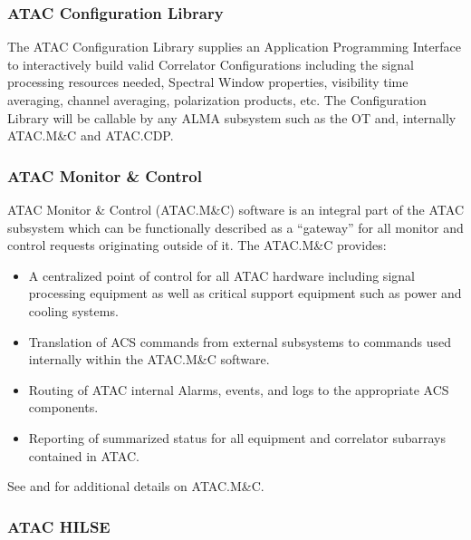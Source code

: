 \subsubsection{ATAC Configuration Library}

The \ac{ATAC} Configuration Library supplies an Application Programming Interface to interactively build valid Correlator Configurations including the signal processing resources needed, Spectral Window properties, visibility time averaging, channel averaging, polarization products, etc.
The Configuration Library will be callable by any \ac{ALMA} subsystem such as the \ac{OT} and, internally \acs{ATAC}.M\&C and \acs{ATAC}.\acs{CDP}.


\subsubsection{ATAC Monitor \& Control}
\label{sec:ATAC.M&C}

\ac{ATAC} Monitor \& Control (\ac{ATAC}.M\&C) software is an integral part of the \ac{ATAC} subsystem which can be functionally described as a “gateway” for all monitor and control requests originating outside of it.
The \ac{ATAC}.M\&C provides:
\begin{itemize}[itemsep=-0.5em]
    \item A centralized point of control for all \ac{ATAC} hardware including signal processing equipment as well as critical support equipment such as power and cooling systems.
    \item Translation of ACS commands from external subsystems to commands used internally within the \ac{ATAC}.M\&C software.
    \item Routing of \ac{ATAC} internal Alarms, events, and logs to the appropriate \ac{ACS} components.
    \item Reporting of summarized status for all equipment and correlator subarrays contained in \ac{ATAC}.
\end{itemize}
See \cite{atac_sdd_dd-1} and \cite{atac_spe_ds-1} for additional details on \ac{ATAC}.M\&C.

\subsubsection{ATAC HILSE}
\label{sec:ATACHILSE}

